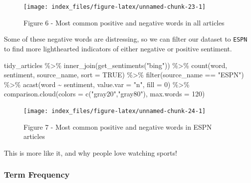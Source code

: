 \documentclass[
]{article}
\newenvironment{Shaded}{\begin{snugshade}}{\end{snugshade}}
\newcommand{\AttributeTok}[1]{\textcolor[rgb]{0.77,0.63,0.00}{#1}}
\newcommand{\ConstantTok}[1]{\textcolor[rgb]{0.00,0.00,0.00}{#1}}
\newcommand{\DecValTok}[1]{\textcolor[rgb]{0.00,0.00,0.81}{#1}}
\newcommand{\FunctionTok}[1]{\textcolor[rgb]{0.00,0.00,0.00}{#1}}
\newcommand{\NormalTok}[1]{#1}
\newcommand{\SpecialCharTok}[1]{\textcolor[rgb]{0.00,0.00,0.00}{#1}}
\newcommand{\StringTok}[1]{\textcolor[rgb]{0.31,0.60,0.02}{#1}}
\begin{document}
\begin{figure}

{\centering \texttt{[image: index\_files/figure-latex/unnamed-chunk-23-1]} 

}

\caption{Figure 6 - Most common positive and negative words in all articles}\label{fig:unnamed-chunk-23}
\end{figure}

Some of these negative words are distressing, so we can filter our
dataset to \texttt{ESPN} to find more lighthearted indicators of either
negative or positive sentiment.

\begin{Shaded}
\begin{Highlighting}[]
\NormalTok{tidy\_articles }\SpecialCharTok{\%\textgreater{}\%}
  \FunctionTok{inner\_join}\NormalTok{(}\FunctionTok{get\_sentiments}\NormalTok{(}\StringTok{"bing"}\NormalTok{)) }\SpecialCharTok{\%\textgreater{}\%}
  \FunctionTok{count}\NormalTok{(word, sentiment, source\_name, }\AttributeTok{sort =} \ConstantTok{TRUE}\NormalTok{) }\SpecialCharTok{\%\textgreater{}\%}
  \FunctionTok{filter}\NormalTok{(source\_name }\SpecialCharTok{==} \StringTok{"ESPN"}\NormalTok{) }\SpecialCharTok{\%\textgreater{}\%}
  \FunctionTok{acast}\NormalTok{(word }\SpecialCharTok{\textasciitilde{}}\NormalTok{ sentiment, }\AttributeTok{value.var =} \StringTok{"n"}\NormalTok{, }\AttributeTok{fill =} \DecValTok{0}\NormalTok{) }\SpecialCharTok{\%\textgreater{}\%}
  \FunctionTok{comparison.cloud}\NormalTok{(}\AttributeTok{colors =} \FunctionTok{c}\NormalTok{(}\StringTok{"gray20"}\NormalTok{,}\StringTok{"gray80"}\NormalTok{), }\AttributeTok{max.words =} \DecValTok{120}\NormalTok{)}
\end{Highlighting}
\end{Shaded}

\begin{figure}

{\centering \texttt{[image: index\_files/figure-latex/unnamed-chunk-24-1]} 

}

\caption{Figure 7 - Most common positive and negative words in ESPN articles}\label{fig:unnamed-chunk-24}
\end{figure}

This is more like it, and why people love watching sports!

\hypertarget{term-frequency}{%
\subsubsection{Term Frequency}\label{term-frequency}}
\end{document}
